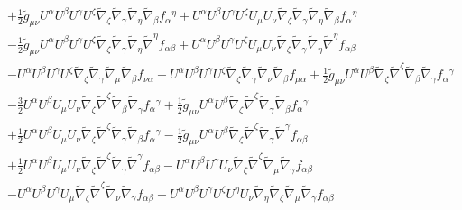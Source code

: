 \documentclass[10pt,letterpaper]{article}
\numberwithin{equation}{section}
\begin{document}
\begin{eqnarray}
&& + \tfrac{1}{2} \tilde{g}_{\mu \nu } U^{\alpha } U^{\beta } U^{\gamma } U^{\zeta } \tilde{\nabla}_{\zeta }\tilde{\nabla}_{\gamma }\tilde{\nabla}_{\eta }\tilde{\nabla}_{\beta }f_{\alpha }{}^{\eta } + U^{\alpha } U^{\beta } U^{\gamma } U^{\zeta } U_{\mu } U_{\nu } \tilde{\nabla}_{\zeta }\tilde{\nabla}_{\gamma }\tilde{\nabla}_{\eta }\tilde{\nabla}_{\beta }f_{\alpha }{}^{\eta } \nonumber \\ 
&& -  \tfrac{1}{2} \tilde{g}_{\mu \nu } U^{\alpha } U^{\beta } U^{\gamma } U^{\zeta } \tilde{\nabla}_{\zeta }\tilde{\nabla}_{\gamma }\tilde{\nabla}_{\eta }\tilde{\nabla}^{\eta }f_{\alpha \beta } + U^{\alpha } U^{\beta } U^{\gamma } U^{\zeta } U_{\mu } U_{\nu } \tilde{\nabla}_{\zeta }\tilde{\nabla}_{\gamma }\tilde{\nabla}_{\eta }\tilde{\nabla}^{\eta }f_{\alpha \beta } \nonumber \\ 
&& -  U^{\alpha } U^{\beta } U^{\gamma } U^{\zeta } \tilde{\nabla}_{\zeta }\tilde{\nabla}_{\gamma }\tilde{\nabla}_{\mu }\tilde{\nabla}_{\beta }f_{\nu \alpha } -  U^{\alpha } U^{\beta } U^{\gamma } U^{\zeta } \tilde{\nabla}_{\zeta }\tilde{\nabla}_{\gamma }\tilde{\nabla}_{\nu }\tilde{\nabla}_{\beta }f_{\mu \alpha } + \tfrac{1}{2} \tilde{g}_{\mu \nu } U^{\alpha } U^{\beta } \tilde{\nabla}_{\zeta }\tilde{\nabla}^{\zeta }\tilde{\nabla}_{\beta }\tilde{\nabla}_{\gamma }f_{\alpha }{}^{\gamma } \nonumber \\ 
&& -  \tfrac{3}{2} U^{\alpha } U^{\beta } U_{\mu } U_{\nu } \tilde{\nabla}_{\zeta }\tilde{\nabla}^{\zeta }\tilde{\nabla}_{\beta }\tilde{\nabla}_{\gamma }f_{\alpha }{}^{\gamma } + \tfrac{1}{2} \tilde{g}_{\mu \nu } U^{\alpha } U^{\beta } \tilde{\nabla}_{\zeta }\tilde{\nabla}^{\zeta }\tilde{\nabla}_{\gamma }\tilde{\nabla}_{\beta }f_{\alpha }{}^{\gamma } \nonumber \\ 
&& + \tfrac{1}{2} U^{\alpha } U^{\beta } U_{\mu } U_{\nu } \tilde{\nabla}_{\zeta }\tilde{\nabla}^{\zeta }\tilde{\nabla}_{\gamma }\tilde{\nabla}_{\beta }f_{\alpha }{}^{\gamma } -  \tfrac{1}{2} \tilde{g}_{\mu \nu } U^{\alpha } U^{\beta } \tilde{\nabla}_{\zeta }\tilde{\nabla}^{\zeta }\tilde{\nabla}_{\gamma }\tilde{\nabla}^{\gamma }f_{\alpha \beta } \nonumber \\ 
&& + \tfrac{1}{2} U^{\alpha } U^{\beta } U_{\mu } U_{\nu } \tilde{\nabla}_{\zeta }\tilde{\nabla}^{\zeta }\tilde{\nabla}_{\gamma }\tilde{\nabla}^{\gamma }f_{\alpha \beta } -  U^{\alpha } U^{\beta } U^{\gamma } U_{\nu } \tilde{\nabla}_{\zeta }\tilde{\nabla}^{\zeta }\tilde{\nabla}_{\mu }\tilde{\nabla}_{\gamma }f_{\alpha \beta } \nonumber \\ 
&& -  U^{\alpha } U^{\beta } U^{\gamma } U_{\mu } \tilde{\nabla}_{\zeta }\tilde{\nabla}^{\zeta }\tilde{\nabla}_{\nu }\tilde{\nabla}_{\gamma }f_{\alpha \beta } -  U^{\alpha } U^{\beta } U^{\gamma } U^{\zeta } U^{\eta } U_{\nu } \tilde{\nabla}_{\eta }\tilde{\nabla}_{\zeta }\tilde{\nabla}_{\mu }\tilde{\nabla}_{\gamma }f_{\alpha \beta } \nonumber \\ 

\end{eqnarray}
\end{document}
